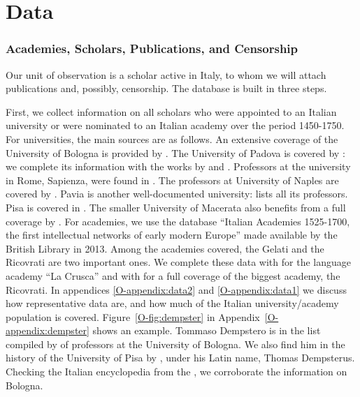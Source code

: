 
\section{Data}\label{section:data}

\subsubsection*{Academies, Scholars, Publications, and Censorship}

Our unit of observation is a scholar active in Italy, to whom we will attach publications and, possibly, censorship. The database is built in three steps.

First, we collect information on all scholars who were appointed to an Italian university or were nominated
to an Italian academy over the period 1450-1750. For universities, the main sources are as follows. An extensive coverage of the University of Bologna is provided by . The University of Padova is covered by : we complete its information with the works by   and . Professors at the university in Rome, Sapienza, were found in . The professors at University of Naples are covered by . Pavia is another well-documented university:   lists all its professors. Pisa is covered in . The smaller University of Macerata also benefits from a full coverage by .
For academies, we use the database ``Italian Academies 1525-1700, the first intellectual networks of early modern Europe'' made available by the British Library in 2013. Among the academies covered, the Gelati and the Ricovrati are two important ones. We complete these data with  for the language academy ``La Crusca'' and with  for a full coverage of the biggest academy, the Ricovrati. In appendices \ref{O-appendix:data2} and \ref{O-appendix:data1}  we discuss how representative  data are, and how much of the Italian university/academy population is covered.
Figure~\ref{O-fig:dempster} in Appendix~\ref{O-appendix:dempster} shows an example. Tommaso Dempstero is in the list compiled by  of professors at the University of Bologna. We also find him in the history of the University of Pisa by , under his Latin name, Thomas Dempsterus. Checking the Italian encyclopedia from the  , we corroborate the information on Bologna.

